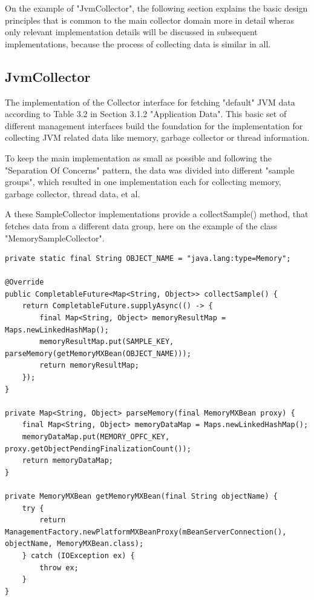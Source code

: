 On the example of "JvmCollector", the following section explains the basic design principles that is common
to the main collector domain more in detail wheras only relevant implementation details will be discussed in
subsequent implementations, because the process of collecting data is similar in all.

\subsection{JvmCollector}

The implementation of the Collector interface for fetching "default" JVM data according to Table 3.2 in
Section 3.1.2 "Application Data". This basic set of different management interfaces build the foundation
for the implementation for collecting JVM related data like memory, garbage collector or thread information.

To keep the main implementation as small as possible and following the "Separation Of Concerns" pattern,
the data was divided into different "sample groups", which resulted in one implementation each for collecting
memory, garbage collector, thread data, et al.

A these SampleCollector implementations provide a collectSample() method, that fetches data from a different data group, here
on the example of the class "MemorySampleCollector".

\begin{lstlisting}[caption={MemorySampleCollector collectSample()}, captionpos=b, label={lst:memory-sample-collect}]
private static final String OBJECT_NAME = "java.lang:type=Memory";

@Override
public CompletableFuture<Map<String, Object>> collectSample() {
    return CompletableFuture.supplyAsync(() -> {
        final Map<String, Object> memoryResultMap = Maps.newLinkedHashMap();
        memoryResultMap.put(SAMPLE_KEY, parseMemory(getMemoryMXBean(OBJECT_NAME)));
        return memoryResultMap;
    });
}

private Map<String, Object> parseMemory(final MemoryMXBean proxy) {
    final Map<String, Object> memoryDataMap = Maps.newLinkedHashMap();
    memoryDataMap.put(MEMORY_OPFC_KEY, proxy.getObjectPendingFinalizationCount());
    return memoryDataMap;
}

private MemoryMXBean getMemoryMXBean(final String objectName) {
    try {
        return ManagementFactory.newPlatformMXBeanProxy(mBeanServerConnection(), objectName, MemoryMXBean.class);
    } catch (IOException ex) {
        throw ex;
    }
}
\end{lstlisting}

